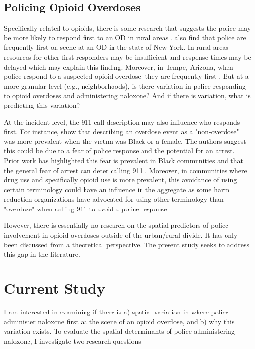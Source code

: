 \subsection{Policing Opioid Overdoses}

Specifically related to opioids, there is some research that suggests the police may be more likely to respond first to an OD in rural areas \parencite{wood_overdose_2021}. \textcite{pourtaher_naloxone_2022} also find that police are frequently first on scene at an OD in the state of New York. In rural areas resources for other first-responders may be insufficient and response times may be delayed which may explain this finding. Moreover, in Tempe, Arizona, when police respond to a suspected opioid overdose, they are frequently first \parencite{white_leveraging_2022}. But at a more granular level (e.g., neighborhoods), is there variation in police responding to opioid overdoses and administering naloxone? And if there is variation, what is predicting this variation?

At the incident-level, the 911 call description may also influence who responds first. For instance, \textcite{atkins_disparities_2024} show that describing an overdose event as a "non-overdose" was more prevalent when the victim was Black or a female. The authors suggest this could be due to a fear of police response and the potential for an arrest. Prior work has highlighted this fear is prevalent in Black communities \parencite{wagner_post-overdose_2019} and that the general fear of arrest can deter calling 911 \parencite{van_der_meulen_thats_2021}. Moreover, in communities where drug use and specifically opioid use is more prevalent, this avoidance of using certain terminology could have an influence in the aggregate as some harm reduction organizations have advocated for using other terminology than "overdose" when calling 911 to avoid a police response \parencite{zagorski_how_2021}.

However, there is essentially no research on the spatial predictors of police involvement in opioid overdoses outside of the urban/rural divide. It has only been discussed from a theoretical perspective. The present study seeks to address this gap in the literature. 

\section{Current Study}

I am interested in examining if there is a) spatial variation in where police administer naloxone first at the scene of an opioid overdose, and b) why this variation exists. To evaluate the spatial determinants of police administering naloxone, I investigate two research questions:

